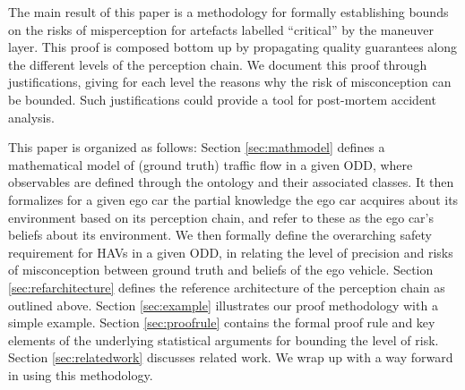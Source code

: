 The main result of this paper is a methodology for formally establishing bounds on the risks of misperception for artefacts labelled \enquote{critical} by the maneuver layer. This proof is composed bottom up by propagating quality guarantees along the different levels of the perception chain. We document this proof through justifications, giving for each level the reasons why the risk of misconception can be bounded. Such justifications could provide a tool for post-mortem accident analysis.

This paper is organized as follows: 
Section \ref{sec:mathmodel} defines a mathematical model of (ground truth) traffic flow in a given ODD, where observables are defined through the ontology and their associated classes. It then formalizes for a given ego car the partial knowledge the ego car acquires about its environment based on its perception chain, and refer to these as the ego car's beliefs about its environment. We then formally define the overarching safety requirement for HAVs in a given ODD, in relating the level of precision and risks of misconception between ground truth and beliefs of the ego vehicle. Section \ref{sec:refarchitecture} defines the reference architecture of the perception chain as outlined above.
Section \ref{sec:example} illustrates our proof methodology with a simple example. Section \ref{sec:proofrule} contains the formal proof rule and key elements of the underlying statistical arguments for bounding the level of risk. Section \ref{sec:relatedwork} discusses related work. We wrap up with a way forward in using this methodology.


